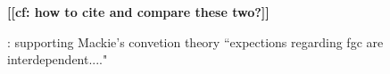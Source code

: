 \documentclass[12pt,]{article}
\newcommand{\comment}[1]{\textbf{[[#1]]}}
\begin{document}
\comment{cf: how to cite \cite{AkhmWord13,EffeVogt15} and compare these two?}









 \cite{Shel-Wand11}:  supporting Mackie's convetion theory ``expections regarding fgc are interdependent...."



\end{document}
